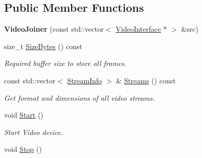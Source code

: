 \subsection*{Public Member Functions}
\begin{DoxyCompactItemize}
\item 
{\bfseries Video\+Joiner} (const std\+::vector$<$ \hyperlink{structpangolin_1_1_video_interface}{Video\+Interface} $\ast$ $>$ \&src)\hypertarget{classpangolin_1_1_video_joiner_a12e4fa5ea8b2d95b135d32fce818fb09}{}\label{classpangolin_1_1_video_joiner_a12e4fa5ea8b2d95b135d32fce818fb09}

\item 
size\+\_\+t \hyperlink{classpangolin_1_1_video_joiner_ad928bb80dc60f22a686c53bf79a462e3}{Size\+Bytes} () const \hypertarget{classpangolin_1_1_video_joiner_ad928bb80dc60f22a686c53bf79a462e3}{}\label{classpangolin_1_1_video_joiner_ad928bb80dc60f22a686c53bf79a462e3}

\begin{DoxyCompactList}\small\item\em Required buffer size to store all frames. \end{DoxyCompactList}\item 
const std\+::vector$<$ \hyperlink{classpangolin_1_1_stream_info}{Stream\+Info} $>$ \& \hyperlink{classpangolin_1_1_video_joiner_a5b9570d085cc766e215fa695206261ae}{Streams} () const \hypertarget{classpangolin_1_1_video_joiner_a5b9570d085cc766e215fa695206261ae}{}\label{classpangolin_1_1_video_joiner_a5b9570d085cc766e215fa695206261ae}

\begin{DoxyCompactList}\small\item\em Get format and dimensions of all video streams. \end{DoxyCompactList}\item 
void \hyperlink{classpangolin_1_1_video_joiner_aa7ba71c954efebd82c890155275e54d1}{Start} ()\hypertarget{classpangolin_1_1_video_joiner_aa7ba71c954efebd82c890155275e54d1}{}\label{classpangolin_1_1_video_joiner_aa7ba71c954efebd82c890155275e54d1}

\begin{DoxyCompactList}\small\item\em Start Video device. \end{DoxyCompactList}\item 
void \hyperlink{classpangolin_1_1_video_joiner_a47a796bf96196681c3eb33ffe0f37559}{Stop} ()\hypertarget{classpangolin_1_1_video_joiner_a47a796bf96196681c3eb33ffe0f37559}{}\label{classpangolin_1_1_video_joiner_a47a796bf96196681c3eb33ffe0f37559}


\end{DoxyCompactItemize}
